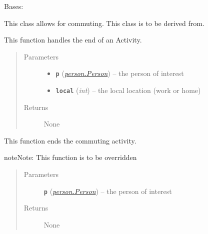 \documentclass[letterpaper,10pt,english]{sphinxmanual}
\begin{document}
\begin{fulllineitems}
\label{commute:commute.Commute}
Bases: {\hyperref[activity:activity.Activity]{\emph{}}}

This class allows for commuting. This class is to be derived from.

\begin{fulllineitems}
\label{commute:commute.Commute.end}
This function handles the end of an Activity.
\begin{quote}\begin{description}
\item[{Parameters}] \leavevmode\begin{itemize}
\item {} 
\textbf{\texttt{p}} ({\hyperref[person:person.Person]{\emph{\emph{person.Person}}}}) -- the person of interest

\item {} 
\textbf{\texttt{local}} (\emph{int}) -- the local location (work or home)

\end{itemize}

\item[{Returns}] \leavevmode
None

\end{description}\end{quote}

\end{fulllineitems}


\begin{fulllineitems}
\label{commute:commute.Commute.end_commute}
This function ends the commuting activity.

\begin{notice}{note}{Note:}
This function is to be overridden
\end{notice}
\begin{quote}\begin{description}
\item[{Parameters}] \leavevmode
\textbf{\texttt{p}} ({\hyperref[person:person.Person]{\emph{\emph{person.Person}}}}) -- the person of interest

\item[{Returns}] \leavevmode
None


\end{description}
\end{quote}
\end{fulllineitems}
\end{fulllineitems}
\end{document}
